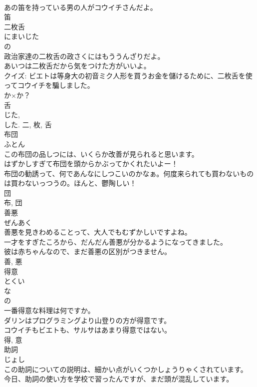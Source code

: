 \documentclass[8pt]{extreport}
\begin{document}
\begin{CJK}{UTF8}{min}
\\	あの笛を持っている男の人がコウイチさんだよ。	
\\	笛	
\\	二枚舌	
\\	にまいじた	
\\	の 
\\	政治家達の二枚舌の政さくにはもううんざりだよ。	
\\	あいつは二枚舌だから気をつけた方がいいよ。	
\\	クイズ: ビエトは等身大の初音ミク人形を買うお金を儲けるために、二枚舌を使ってコウイチを騙しました。
\\	か×か？	
\\	舌 
\\	じた, 
\\	した.	二, 枚, 舌	
\\	布団	
\\	ふとん	
\\	この布団の品しつには、いくらか改善が見られると思います。	
\\	はずかしすぎて布団を頭からかぶってかくれたいよー！	
\\	布団の勧誘って、何であんなにしつこいのかなぁ。何度来られても買わないものは買わないっつうの。ほんと、鬱陶しい！	
\\	団 
\\	布, 団	
\\	善悪	
\\	ぜんあく	
\\	善悪を見きわめることって、大人でもむずかしいですよね。	
\\	一才をすぎたころから、だんだん善悪が分かるようになってきました。	
\\	彼は赤ちゃんなので、まだ善悪の区別がつきません。	
\\	善, 悪	
\\	得意	
\\	とくい	
\\	な 
\\	の 
\\	一番得意な料理は何ですか。	
\\	ダリンはプログラミングより山登りの方が得意です。	
\\	コウイチもビエトも、サルサはあまり得意ではない。	
\\	得, 意	
\\	助詞	
\\	じょし	
\\	この助詞についての説明は、細かい点がいくつかしょうりゃくされています。	
\\	今日、助詞の使い方を学校で習ったんですが、まだ頭が混乱しています。	

\end{CJK}
\end{document}
